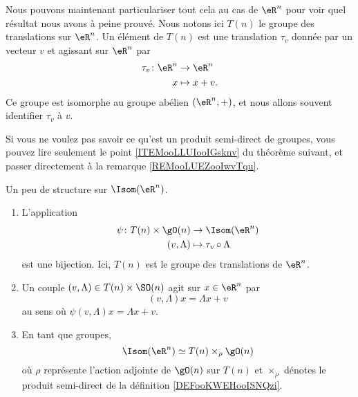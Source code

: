 Nous pouvons maintenant particulariser tout cela au cas de \( \eR^n\) pour voir quel résultat nous avons à peine prouvé. Nous notons ici \( T(n)\) le groupe des translations sur \( \eR^n\). Un élément de \( T(n)\) est une translation \( \tau_v\) donnée par un vecteur \( v\) et agissant sur \( \eR^n\) par
\begin{equation}
    \begin{aligned}
        \tau_v\colon \eR^n&\to \eR^{n} \\
        x&\mapsto x+v. 
    \end{aligned}
\end{equation}
Ce groupe est isomorphe au groupe abélien \( (\eR^n,+)\), et nous allons souvent identifier \( \tau_v\) à \( v\).

Si vous ne voulez pas savoir ce qu'est un produit semi-direct de groupes, vous pouvez lire seulement le point \ref{ITEMooLLUIooIGsknv} du théorème suivant, et passer directement à la remarque \ref{REMooLUEZooIwvTqu}.
\begin{theorem}     \label{THOooQJSRooMrqQct}
    Un peu de structure sur \( \Isom(\eR^n)\).
    \begin{enumerate}
        \item       \label{ITEMooLLUIooIGsknv}
            L'application
            \begin{equation}
                \begin{aligned}
                    \psi\colon T(n)\times \gO(n)&\to \Isom(\eR^n) \\
                    (v,\Lambda)&\mapsto \tau_v\circ\Lambda 
                \end{aligned}
            \end{equation}
            est une bijection. Ici,  \( T(n)\) est le groupe des translations de \( \eR^n\).
        \item
            Un couple \( (v,\Lambda)\in T(n)\times\SO(n)\) agit sur \( x\in \eR^n\) par
            \begin{equation}
                (v,\Lambda)x=\Lambda x+v
            \end{equation}
            au sens où \( \psi(v,\Lambda)x=\Lambda x+v\).
        \item
            En tant que groupes,
            \begin{equation}
                \Isom(\eR^n)\simeq T(n)\times_{\rho}\gO(n)
            \end{equation}
            où \( \rho\) représente l'action adjointe de \( \gO(n)\) sur \( T(n)\) et \( \times_{\rho}\) dénotes le produit semi-direct de la définition \ref{DEFooKWEHooISNQzi}.
    \end{enumerate}
\end{theorem}

